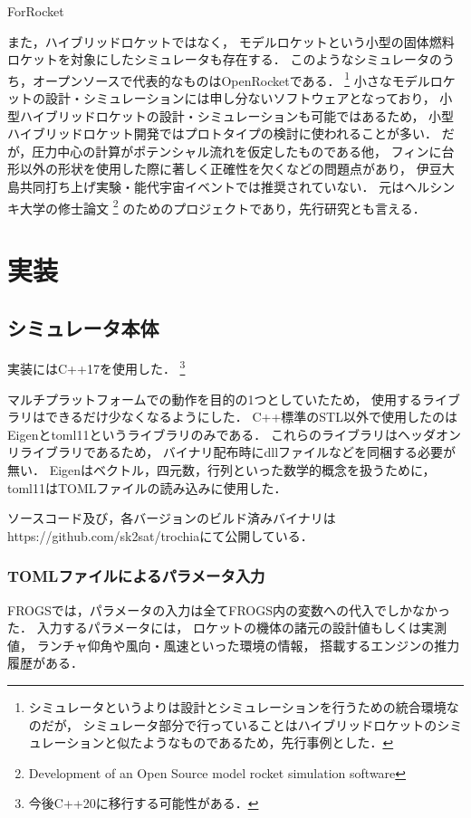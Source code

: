 \documentclass[a4j,10pt]{jsarticle}
\begin{document}
ForRocket

また，ハイブリッドロケットではなく，
モデルロケットという小型の固体燃料ロケットを対象にしたシミュレータも存在する．
このようなシミュレータのうち，オープンソースで代表的なものはOpenRocketである．
\footnote{シミュレータというよりは設計とシミュレーションを行うための統合環境なのだが，
シミュレータ部分で行っていることはハイブリッドロケットのシミュレーションと似たようなものであるため，先行事例とした．}
小さなモデルロケットの設計・シミュレーションには申し分ないソフトウェアとなっており，
小型ハイブリッドロケットの設計・シミュレーションも可能ではあるため，
小型ハイブリッドロケット開発ではプロトタイプの検討に使われることが多い．
だが，圧力中心の計算がポテンシャル流れを仮定したものである他，
フィンに台形以外の形状を使用した際に著しく正確性を欠くなどの問題点があり，
伊豆大島共同打ち上げ実験・能代宇宙イベントでは推奨されていない．
元はヘルシンキ大学の修士論文
\footnote{Development of an Open Source model rocket simulation
software}
のためのプロジェクトであり，先行研究とも言える．


\section{実装}

\subsection{シミュレータ本体}

実装にはC++17を使用した．
\footnote{今後C++20に移行する可能性がある．}

マルチプラットフォームでの動作を目的の1つとしていたため，
使用するライブラリはできるだけ少なくなるようにした．
C++標準のSTL以外で使用したのはEigenとtoml11というライブラリのみである．
これらのライブラリはヘッダオンリライブラリであるため，
バイナリ配布時にdllファイルなどを同梱する必要が無い．
Eigenはベクトル，四元数，行列といった数学的概念を扱うために，
toml11はTOMLファイルの読み込みに使用した．

ソースコード及び，各バージョンのビルド済みバイナリはhttps://github.com/sk2sat/trochiaにて公開している．

\subsubsection{TOMLファイルによるパラメータ入力}
FROGSでは，パラメータの入力は全てFROGS内の変数への代入でしかなかった．
入力するパラメータには，
ロケットの機体の諸元の設計値もしくは実測値，
ランチャ仰角や風向・風速といった環境の情報，
搭載するエンジンの推力履歴がある．
\end{document}
